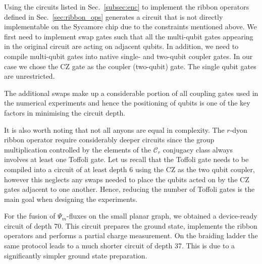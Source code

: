 \documentclass[a4paper,twocolumn,11pt]{quantumarticle}
\begin{document}
Using the circuits listed in Sec.~\ref{subsec:enc} to implement the ribbon operators defined in Sec.~\ref{sec:ribbon_ops} generates a circuit that is not directly implementable on the Sycamore chip due to the constraints mentioned above. We first need to implement swap gates such that all the multi-qubit gates appearing in the original circuit are acting on adjacent qubits. In addition, we need to compile multi-qubit gates into native single- and two-qubit coupler gates. In our case we chose the CZ gate as the coupler (two-qubit) gate. The single qubit gates are unrestricted.  

The additional swaps make up a considerable portion of all coupling gates used in the numerical experiments and hence the positioning of qubits is one of the key factors in minimising the circuit depth.

It is also worth noting that not all anyons are equal in complexity. The $r$-dyon ribbon operator require considerably deeper circuits since the group multiplication controlled by the elements of the $\mathcal{C}_r$ conjugacy class always involves at least one Toffoli gate. Let us recall that the Toffoli gate needs to be compiled into a circuit of at least depth 6 using the CZ as the two qubit coupler, however this neglects any swaps needed to place the qubits acted on by the CZ gates adjacent to one another. Hence, reducing the number of Toffoli gates is the main goal when designing the experiments.


For the fusion of $\Psi_m$-fluxes on the small planar graph, we obtained a device-ready circuit of depth 70. This circuit prepares the ground state, implements the ribbon operators and performs a partial charge measurement. 
On the braiding ladder the same protocol leads to a much shorter circuit of depth 37. This is due to a significantly simpler ground state preparation.
\end{document}

